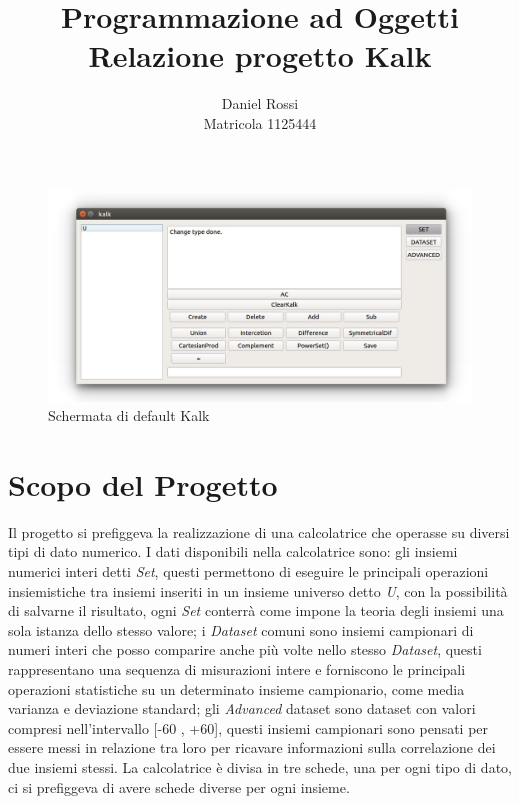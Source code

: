 \documentclass[a4paper,10pt]{article}
\begin{document}
	
	\title{Programmazione ad Oggetti\\Relazione progetto Kalk}
	\author{Daniel Rossi\\Matricola 1125444}
	\date{}
	\maketitle
	\begin{figure}[!h]
		\includegraphics[scale=0.5]{img/kalk.jpg}
			\caption{Schermata di default Kalk}
    \end{figure}
    \newpage
	\tableofcontents
	\newpage
	
    \section{Scopo del Progetto}
    Il progetto si prefiggeva la realizzazione di una calcolatrice che operasse su diversi tipi di dato numerico. I dati disponibili nella calcolatrice sono: gli insiemi numerici interi detti \textit{Set}, questi permettono di eseguire le principali operazioni insiemistiche tra insiemi inseriti in un insieme universo detto \textit{U}, con la possibilità di salvarne il risultato, ogni \textit{Set} conterrà come impone la teoria degli insiemi una sola istanza dello stesso valore; i \textit{Dataset} comuni sono insiemi campionari di numeri interi che posso comparire anche più volte nello stesso \textit{Dataset}, questi rappresentano una sequenza di misurazioni intere e forniscono le principali operazioni statistiche su un determinato insieme campionario, come media varianza e deviazione standard; gli \textit{Advanced} dataset sono dataset con valori compresi nell’intervallo [-60 , +60], questi insiemi campionari sono pensati per essere messi in relazione tra loro per ricavare informazioni sulla correlazione dei due insiemi stessi. La calcolatrice è divisa in tre schede, una per ogni tipo di dato, ci si prefiggeva di avere schede diverse per ogni insieme.
\end{document}
